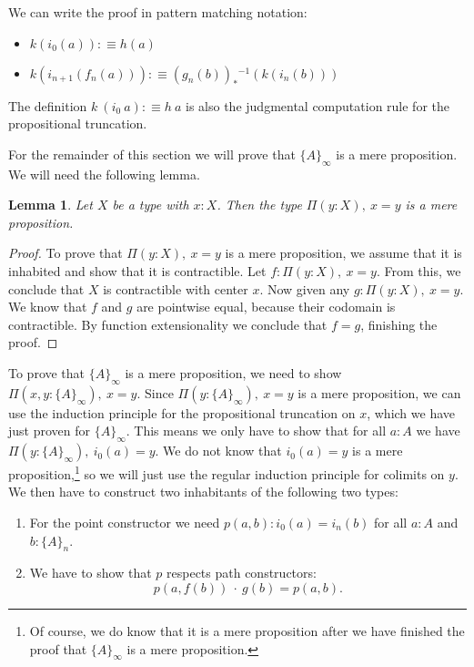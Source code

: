\documentclass[square]{sigplanconf}
\newcommand{\fa}[2]{\ensuremath{\Pi(#1),\ #2}}
\newcommand{\sy}{\ensuremath{^{-1}}}
\newtheorem{lemma}[theorem]{Lemma}
\theoremstyle{definition}
\theoremstyle{remark}
\begin{document}
We can write the proof in pattern matching notation:
\begin{itemize}
\item $k(i_0(a)):\equiv h(a)$
\item $k(i_{n+1}(f_n(a))):\equiv(g_n(b))_*\sy(k(i_n(b)))$
\end{itemize}
The definition $k\ (i_{0}\ a) :\equiv h\ a$ is also the judgmental computation rule for the
propositional truncation.

For the remainder of this section we will prove that $\{A\}_\infty$ is a mere proposition. We will
need the following lemma.

\begin{lemma}\label{l:pieq}
  Let $X$ be a type with $x : X$. Then the type $\fa{y:X}{x=y}$ is a mere proposition.
\end{lemma}
\begin{proof}
  To prove that $\fa{y:X}{x=y}$ is a mere proposition, we assume that it is inhabited and show that
  it is contractible. Let $f : \fa{y : X}{x = y}$. From this, we conclude that $X$ is contractible
  with center $x$. Now given any $g : \fa{y : X}{x = y}$. We know that $f$ and $g$ are pointwise
  equal, because their codomain is contractible. By function extensionality we conclude that $f=g$,
  finishing the proof.
\end{proof}

To prove that $\{A\}_\infty$ is a mere proposition, we need to show $\fa{x, y :
  \{A\}_\infty}{x=y}$. Since $\fa{y : \{A\}_\infty}{x=y}$ is a mere proposition, we can use the
induction principle for the propositional truncation on $x$, which we have just proven for
$\{A\}_\infty$. This means we only have to show that for all $a : A$ we have $\fa{y :
  \{A\}_\infty}{i_0(a)=y}$. We do not know that $i_0(a)=y$ is a mere proposition,\footnote{Of
  course, we do know that it is a mere proposition after we have finished the proof that
  $\{A\}_\infty$ is a mere proposition.} so we will just use the regular induction principle for
colimits on $y$. We then have to construct two inhabitants of the following two types:
\begin{enumerate}
\item For the point constructor we need $p(a,b) : i_0(a) = i_n(b)$ for all $a : A$ and $b :
  \{A\}_n$.
\item We have to show that $p$ respects path constructors:
  \begin{equation}
    p(a,f(b))\ \cdot\ g(b) = p(a,b).\label{e:coh}
  \end{equation}
\end{enumerate}
\end{document}
